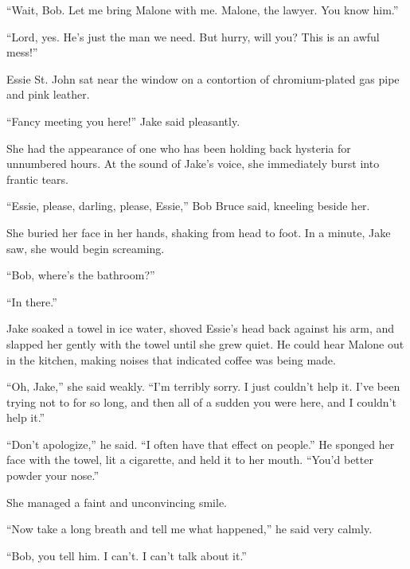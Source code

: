 \documentclass{novel}
\begin{document}
“Wait, Bob. Let me bring Malone with me. Malone, the lawyer. You know him.”

“Lord, yes. He’s just the man we need. But hurry, will you? This is an awful mess!”

\begin{ChapterStart}
\vspace{3\nbs}
\end{ChapterStart}

Essie St. John sat near the window on a contortion of chromium-plated gas pipe and pink leather.

“Fancy meeting you here!” Jake said pleasantly.

She had the appearance of one who has been holding back hysteria for unnumbered hours. At the sound of Jake’s voice, she immediately burst into frantic tears.

“Essie, please, darling, please, Essie,” Bob Bruce said, kneeling beside her.

She buried her face in her hands, shaking from head to foot. In a minute, Jake saw, she would begin screaming.

“Bob, where’s the bathroom?”

“In there.”

Jake soaked a towel in ice water, shoved Essie’s head back against his arm, and slapped her gently with the towel until she grew quiet. He could hear Malone out in the kitchen, making noises that indicated coffee was being made.

“Oh, Jake,” she said weakly. “I’m terribly sorry. I just couldn’t help it. I’ve been trying not to for so long, and then all of a sudden you were here, and I couldn’t help it.”

“Don’t apologize,” he said. “I often have that effect on people.” He sponged her face with the towel, lit a cigarette, and held it to her mouth. “You’d better powder your nose.”

She managed a faint and unconvincing smile.

“Now take a long breath and tell me what happened,” he said very calmly.

“Bob, you tell him. I can’t. I can’t talk about it.”
\end{document}
